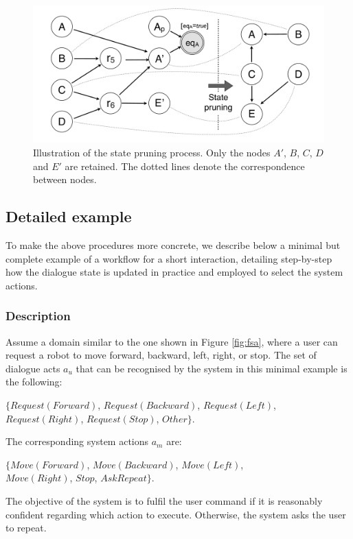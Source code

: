 \begin{figure}[h]
\centering
\includegraphics[scale=0.21]{imgs/pruning.pdf}
\caption{Illustration of the state pruning process. Only the nodes $A'$, $B$, $C$, $D$ and $E'$ are retained. The dotted lines denote the correspondence between nodes.}
\label{fig:pruning}
\end{figure}


\subsection{Detailed example}
\label{sec:detailedexample}

To make the above procedures more concrete, we describe below a minimal but complete example of a workflow for a short interaction, detailing step-by-step how the dialogue state is updated in practice and employed to select the system actions. 

\subsubsection*{Description}

Assume a domain similar to the one shown in Figure \ref{fig:fsa}, where a user can request a robot to move forward, backward, left, right, or stop.  The set of dialogue acts $a_u$ that can be recognised by the system in this minimal example is the following: 
\begin{center}
$\{\mathit{Request(Forward)}$, $\mathit{Request(Backward)}$, $\mathit{Request(Left)}$, \\ $\mathit{Request(Right)}$, $\mathit{Request(Stop)}$, $\mathit{Other}\}$. \\
\end{center}
The corresponding system actions $a_m$ are: 
\begin{center}
$\{\mathit{Move(Forward)}$, $\mathit{Move(Backward)}$, $\mathit{Move(Left)}$, \\ $\mathit{Move(Right)}$, $\mathit{Stop}$, $\mathit{AskRepeat}\}$. 
\end{center}
The objective of the system is to fulfil the user command if it is reasonably confident regarding which action to execute.  Otherwise, the system asks the user to repeat. 

